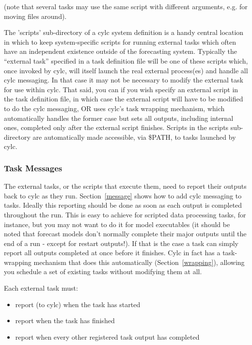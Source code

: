 \documentclass[11pt,a4paper]{article}
\begin{document}
(note that several tasks may use the same script with different
arguments, e.g. for moving files around).

The 'scripts' sub-directory of a cylc system definition is a handy
central location in which to keep system-specific scripts for running
external tasks which often have an independent existence outside of the
forecasting system. Typically the ``external task'' specified in a task
definition file will be one of these scripts which, once invoked by
cylc, will itself launch the real external process(es) and handle all
cylc messaging. In that case it may not be necessary to modify the
external task for use within cylc.  That said, you can if you wish
specify an external script in the task definition file, in which case 
the external script will have to be modified to do the cylc messaging,
OR uses cylc's task wrapping mechanism, which automatically handles the
former case but sets all outputs, including internal ones, completed
only after the external script finishes.  Scripts in the scripts
sub-directory are automatically made accessible, via \$PATH, to tasks
launched by cylc. 

\subsubsection{Task Messages}

The external tasks, or the scripts that execute them, need to report
their outputs back to cylc as they run. Section~\ref{message} shows
how to add cylc messaging to tasks.  Ideally this reporting should be
done as soon as each output is completed throughout the run. This is
easy to achieve for scripted data processing tasks, for instance, but
you may not want to do it for model executables (it should be noted that
forecast models don't normally complete their major outputs until the
end of a run - except for restart outputs!). If that is the case a task
can simply report all outputs completed at once before it finishes.
Cylc in fact has a task-wrapping mechanism that does this automatically
(Section~\ref{wrapping}), allowing you schedule a set of existing
tasks without modifying them at all.  

Each external task must:

\begin{itemize}
\item report (to cylc) when the task has started
\item report when the task has finished
\item report when every other registered task output has
completed
\end{itemize}
\end{document}
